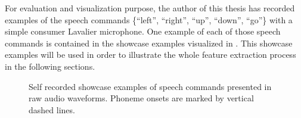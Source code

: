 For evaluation and visualization purpose, the author of this thesis has recorded examples of the speech commands \{\enquote{left}, \enquote{right}, \enquote{up}, \enquote{down}, \enquote{go}\} with a simple consumer Lavalier microphone.
One example of each of those speech commands is contained in the showcase examples visualized in .
This showcase examples will be used in order to illustrate the whole feature extraction process in the following sections.
\begin{figure}[!ht]
  \centering
    \quad
    \quad
  \caption{Self recorded showcase examples of speech commands presented in raw audio waveforms. Phoneme onsets are marked by vertical dashed lines.}
  \label{fig:signal_raw_showcase}
\end{figure}
